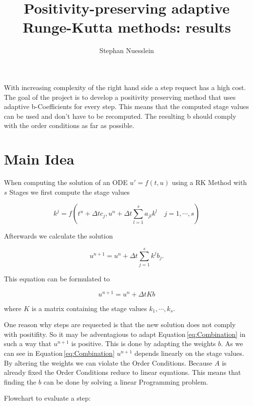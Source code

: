 \documentclass{article}
\title{Positivity-preserving adaptive Runge-Kutta methods: results}
\author{Stephan Nuesslein}
\begin{document}
\maketitle

With increasing complexity of the right hand side a step requect has a high cost. 
The goal of the project is to develop a positivity preserving method that uses adaptive b-Coefficients for every step.  This means that the computed stage values can be used and don't have to be recomputed. 
The resulting b should comply with the order conditions as far as possible.

\section{Main Idea}

When computing the solution of an ODE $u ' = f(t,u) $ using a RK Method with $s$ Stages we first compute the stage values 

\begin{equation}
k^{j} =  f(t^n + \Delta t c_j, u^n + \Delta t \sum_{l = 1}^{s} a_{jl} k^l  \quad j = 1,\cdots,s)
\end{equation}

Afterwards we calculate the solution 

\begin{equation}
u^{n+1} = u^n + \Delta t \sum_{j  = 1}^s k^{j} b_j .
\end{equation}

This equation can be formulated to

\begin{equation}\label{eq:Combination}
u^{n+1} = u^n + \Delta t K b
\end{equation}

where $K$ is a matrix containing the stage values $k_1,\cdots,k_s$.

One reason why steps are requected is that the new solution does not comply with positifity. 
So it may be adventagious to adapt Equation\,\ref{eq:Combination} in such a way that $u^{n+1}$ is positive. This is done by adapting the weights $b$.
As we can see in Equation\,\ref{eq:Combination} $u^{n+1}$ depends linearly on the stage values.
By altering the weights we can violate the Order Conditions. 
Because $A$ is already fixed the Order Conditions reduce to linear equations.
This means that finding the $b$ can be done by solving a linear Programming problem.
 



Flowchart to evaluate a step:
\end{document}
